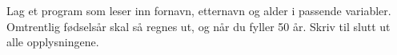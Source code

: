 %
%
Lag et program som leser inn fornavn, etternavn og alder i passende variabler. Omtrentlig fødselsår skal så regnes ut, og når du fyller 50 år. Skriv til slutt ut alle opplysningene.
